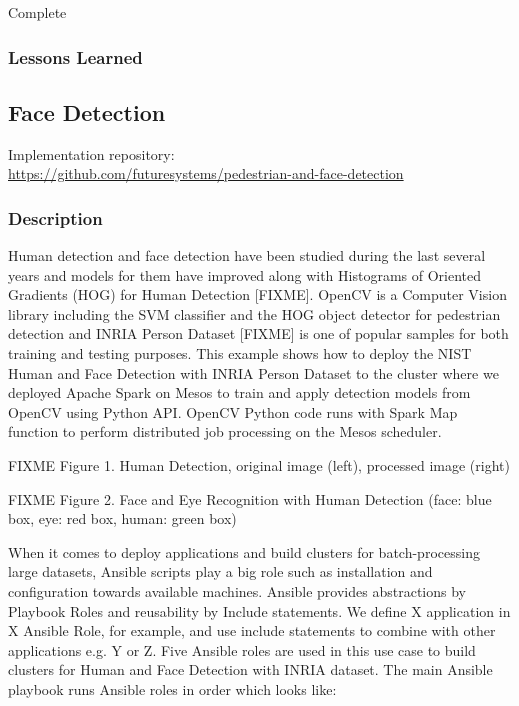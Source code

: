 \documentclass[9pt,twocolumn,twoside]{styles/osajnl}
\begin{document}
Complete



\subsubsection{Lessons Learned}

\subsection{Face Detection}

Implementation repository:\\
 \url{https://github.com/futuresystems/pedestrian-and-face-detection}

\subsubsection{Description}

Human detection and face detection have been studied during the last
several years and models for them have improved along with Histograms
of Oriented Gradients (HOG) for Human Detection [FIXME]. OpenCV is a
Computer Vision library including the SVM classifier and the HOG
object detector for pedestrian detection and INRIA Person Dataset [FIXME]
is one of popular samples for both training and testing purposes. This
example shows how to deploy the NIST Human and Face Detection with
INRIA Person Dataset to the cluster where we deployed Apache Spark on
Mesos to train and apply detection models from OpenCV using Python
API. OpenCV Python code runs with Spark Map function to perform
distributed job processing on the Mesos scheduler.
  
  

FIXME Figure 1. Human Detection, original image (left), processed image (right)
  
  

FIXME Figure 2. Face and Eye Recognition with Human Detection (face: blue box, eye: red box, human: green box)


When it comes to deploy applications and build clusters for
batch-processing large datasets, Ansible scripts play a big role such
as installation and configuration towards available machines. Ansible
provides abstractions by Playbook Roles and reusability by Include
statements. We define X application in X Ansible Role, for example,
and use include statements to combine with other applications e.g. Y
or Z. Five Ansible roles are used in this use case to build clusters
for Human and Face Detection with INRIA dataset. The main Ansible
playbook runs Ansible roles in order which looks like:
\end{document}

